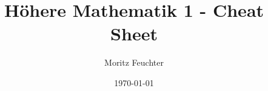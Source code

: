 \documentclass[a4paper,10pt]{article}
\title{Höhere Mathematik 1 - Cheat Sheet}
\author{Moritz Feuchter}
\date{\today}
\begin{document}
    \maketitle

    \begin{multicols*}{2}
        
        \raggedcolumns
    \end{multicols*}
\end{document}
